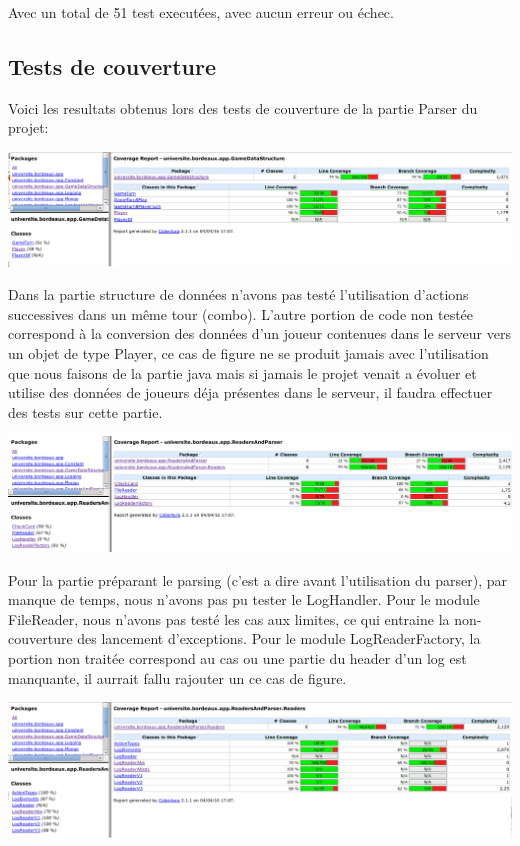 Avec un total de 51 test executées, avec aucun erreur ou échec.

\subsection{Tests de couverture}
Voici les resultats obtenus lors des tests de couverture de la partie Parser du projet:

\includegraphics[scale=0.35,keepaspectratio]{./coverage_GameDataStructure}

Dans la partie structure de données n'avons pas testé l'utilisation d'actions successives dans un même tour (combo). L'autre portion de code non testée correspond à la conversion des données d'un joueur contenues dans le serveur vers un objet de type Player, ce cas de figure ne se produit jamais avec l'utilisation que nous faisons de la partie java mais si jamais le projet venait a évoluer et utilise des données de joueurs déja présentes dans le serveur, il faudra effectuer des tests sur cette partie.

\includegraphics[scale=0.35,keepaspectratio]{./coverage_ReadersAndParser}

Pour la partie préparant le parsing (c'est a dire avant l'utilisation du parser), par manque de temps, nous n'avons pas pu tester le LogHandler. Pour le module FileReader, nous n'avons pas testé les cas aux limites, ce qui entraine la non-couverture des lancement d'exceptions. Pour le module LogReaderFactory, la portion non traitée correspond au cas ou une partie du header d'un log est manquante, il aurrait fallu rajouter un ce cas de figure.

\includegraphics[scale=0.35,keepaspectratio]{./coverage_ReadersLog}


